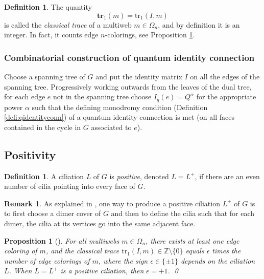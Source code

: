 \documentclass[12pt, reqno]{amsart}
\newtheorem{prop}[theo]{Proposition}
\theoremstyle{definition}
\newtheorem{defi}[theo]{Definition}
\newtheorem{rema}[theo]{Remark}
\newcommand{\Z}{\mathbb{Z}}%
\begin{document}
\begin{defi}\label{defi:classicaltrace}
The quantity 
$$
\mathbf{tr}_1(m)=\mathrm{tr}_1(I,m)
$$
is called the \emph{classical trace} of a multiweb $m\in\Omega_n$, and by definition it is an integer. In fact, it counts edge $n$-colorings, see Proposition \ref{prop:positivecilia}.
\end{defi}

\subsubsection{Combinatorial construction of quantum identity connection}\label{sssec:combinatorialconstructionofquantumidentityconnection}

Choose a spanning tree of $G$ and put the identity matrix $I$ on all the edges of the spanning tree.  Progressively working outwards from the leaves of the dual tree,    for each edge $e$ not in the spanning tree choose $I_q(e)=Q^\alpha$ for the appropriate power $\alpha$ such that the defining monodromy condition (Definition \ref{defi:qidentityconn}) of a quantum identity connection is met (on all faces contained in the cycle in $G$ associated to $e$).

\subsection{Positivity}

\begin{defi}\label{defi:positiveciliation}
A ciliation $L$ of $G$ is \emph{positive}, denoted $L=L^+$, if there are an even number of cilia pointing into every face of $G$.  
\end{defi}

\begin{rema}
As explained in \cite{DKS}, one way to produce a positive ciliation $L^+$ of $G$ is to first choose a dimer cover of $G$ and then to define the cilia such that for each dimer, the cilia at its vertices go into the same adjacent face.
\end{rema}

\begin{prop}[\cite{DKS}]\label{prop:positivecilia}
For all multiwebs $m\in\Omega_n$, there exists at least one edge coloring of $m$, and the classical trace $\mathrm{tr}_1(I,m)\in\Z\setminus\{0\}$ equals $\epsilon$ times the number of edge colorings of $m$, where the sign $\epsilon\in\{\pm1\}$ depends on the ciliation $L$.  When $L=L^+$ is a positive ciliation, then $\epsilon=+1$.  
\qed\end{prop}
\end{document}
